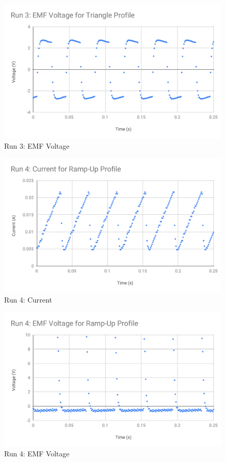 %
\begin{figure}[ht]
	\centering
	\includegraphics[scale=0.74]{image/04-faraday/run-3-V.pdf}
	\caption{Run 3: EMF Voltage}
	\label{figure.04.run.3.V}
\end{figure}
%
\begin{figure}[ht]
	\centering
	\includegraphics[scale=0.74]{image/04-faraday/run-4-I.pdf}
	\caption{Run 4: Current}
	\label{figure.04.run.4.I}
\end{figure}
%
\begin{figure}[ht]
	\centering
	\includegraphics[scale=0.74]{image/04-faraday/run-4-V.pdf}
	\caption{Run 4: EMF Voltage}
	\label{figure.04.run.4.V}
\end{figure}
